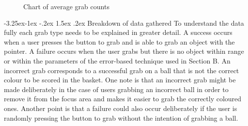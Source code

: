 \documentclass[12pt]{article}
\makeatletter
\renewcommand{\subsubsection}{\@startsection{subsubsection}{2}{\z@}%
             {-3.25ex\@plus -1ex \@minus -.2ex}%
             {1.5ex \@plus .2ex}%
             {\normalfont\normalsize\scshape\bfseries}}
\makeatother
\begin{document}
\begin{figure}
\centering 
\hspace{-1cm}
\caption{Chart of average grab counts}
\end{figure}


\subsubsection{Breakdown of data gathered}
To understand the data fully each grab type needs to be explained in greater detail. A success occurs when a user presses the button to grab and is able to grab an object with the pointer. A failure occurs when the user grabs but there is no object within range or within the parameters of the error-based technique used in Section B. An incorrect grab corresponds to a successful grab on a ball that is not the correct colour to be scored in the basket. One note is that an incorrect grab might be made deliberately in the case of users grabbing an incorrect ball in order to remove it from the focus area and makes it easier to grab the correctly coloured ones. Another point is that a failure could also occur deliberately if the user is randomly pressing the button to grab without the intention of grabbing a ball.
\end{document}
